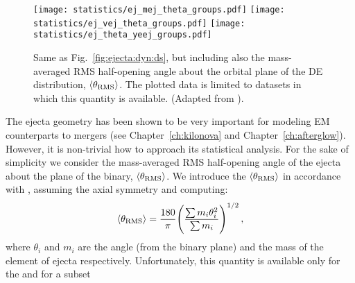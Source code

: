 \begin{figure*}[t]
    \centering 
    \texttt{[image: statistics/ej\_mej\_theta\_groups.pdf]}
    \texttt{[image: statistics/ej\_vej\_theta\_groups.pdf]}
    \texttt{[image: statistics/ej\_theta\_yeej\_groups.pdf]}
    \caption{
        Same as Fig.~\ref{fig:ejecta:dyn:ds}, but including also the 
        mass-averaged \ac{RMS} half-opening angle about the orbital plane of the 
        \ac{DE} distribution, $\langle\theta_{\rm RMS}\rangle$. The plotted 
        data is limited to datasets in which this quantity is available. 
        (Adapted from \citet{Nedora:2020qtd}).
    }
    \label{fig:ejecta:dynej_thetarms}
\end{figure*}
%
The ejecta geometry has been shown to be very important for modeling \ac{EM} 
counterparts to mergers (see Chapter~\ref{ch:kilonova} and Chapter~\ref{ch:afterglow}). %
However, it is non-trivial how to approach its statistical analysis. 
For the sake of simplicity 
we consider the mass-averaged \ac{RMS} half-opening 
angle of the ejecta about the plane of the binary, $\langle\theta_{\rm RMS}\rangle$.
We introduce the $\langle\theta_{\rm RMS}\rangle$ in accordance with \citet{Radice:2018pdn}, assuming 
the axial symmetry and computing:
%
\begin{equation}
\langle\theta_{\rm RMS}\rangle = \frac{180}{\pi}\Bigg(\frac{\sum m_i \theta_i^2}{\sum m_i}\Bigg)^{1/2}\, ,
\end{equation}
%
where $\theta_i$ and $m_i$ are the angle (from the binary plane) and the mass of 
the element of ejecta respectively.
%
Unfortunately, this quantity is available only for the \DSrefset{} and for a subset 
